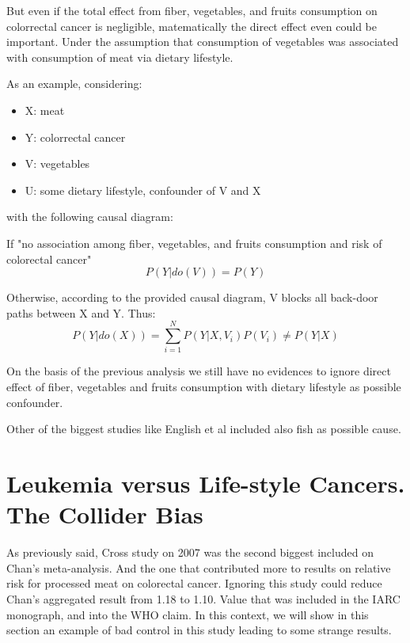 \documentclass{article}
\begin{document}
But even if the total effect from fiber, vegetables, and fruits consumption on colorrectal cancer is negligible, matematically the direct effect even could be important. Under the assumption that consumption of vegetables was associated with consumption of meat via dietary lifestyle.

As an example, considering:

\begin{itemize}
\item X: meat
\item Y: colorrectal cancer
\item V: vegetables
\item U: some dietary lifestyle, confounder of V and X
\end{itemize}

with the following causal diagram:


If "no association among fiber, vegetables, and fruits consumption and risk of colorectal cancer"
\begin{equation}
  P(Y|do(V))=P(Y)
\end{equation}

Otherwise, according to the provided causal diagram, V blocks all back-door paths between X and Y. Thus:
\begin{equation}
P(Y|do(X))=\sum _{i=1}^{N} P(Y|X,V_i)P(V_i) \neq P (Y|X)
\end{equation}


On the basis of the previous analysis we still have no evidences to ignore direct effect of fiber, vegetables and fruits consumption with dietary lifestyle as possible confounder.

Other of the biggest studies like English et al \cite{english} included also fish as possible cause.

\section{Leukemia versus Life-style Cancers. The Collider Bias}
\label{sec:cross}
As previously said, Cross study on 2007 \cite{cross} was the second biggest included on Chan's meta-analysis. And the one that contributed more to results on relative risk for processed meat on colorectal cancer. Ignoring this study could reduce Chan's aggregated result from 1.18 to 1.10. Value that was included in the IARC monograph, and into the WHO claim.
In this context, we will show in this section an example of bad control in this study leading to some strange results.
\end{document}
